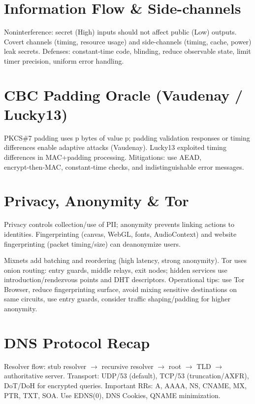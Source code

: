 \documentclass[11pt]{article}
\begin{document}
\section{Information Flow \& Side-channels}
Noninterference: secret (High) inputs should not affect public (Low) outputs. Covert channels (timing, resource usage) and side-channels (timing, cache, power) leak secrets. Defenses: constant-time code, blinding, reduce observable state, limit timer precision, uniform error handling.

\section{CBC Padding Oracle (Vaudenay / Lucky13)}
PKCS\#7 padding uses p bytes of value p; padding validation responses or timing differences enable adaptive attacks (Vaudenay). Lucky13 exploited timing differences in MAC+padding processing. Mitigations: use AEAD, encrypt‑then‑MAC, constant‑time checks, and indistinguishable error messages.

\section{Privacy, Anonymity \& Tor}
Privacy controls collection/use of PII; anonymity prevents linking actions to identities. Fingerprinting (canvas, WebGL, fonts, AudioContext) and website fingerprinting (packet timing/size) can deanonymize users.

Mixnets add batching and reordering (high latency, strong anonymity). Tor uses onion routing: entry guards, middle relays, exit nodes; hidden services use introduction/rendezvous points and DHT descriptors. Operational tips: use Tor Browser, reduce fingerprinting surface, avoid mixing sensitive destinations on same circuits, use entry guards, consider traffic shaping/padding for higher anonymity.

\section{DNS Protocol Recap}
Resolver flow: stub resolver $\rightarrow$ recursive resolver $\rightarrow$ root $\rightarrow$ TLD $\rightarrow$ authoritative server. Transport: UDP/53 (default), TCP/53 (truncation/AXFR), DoT/DoH for encrypted queries. Important RRs: A, AAAA, NS, CNAME, MX, PTR, TXT, SOA. Use EDNS(0), DNS Cookies, QNAME minimization.
\end{document}
